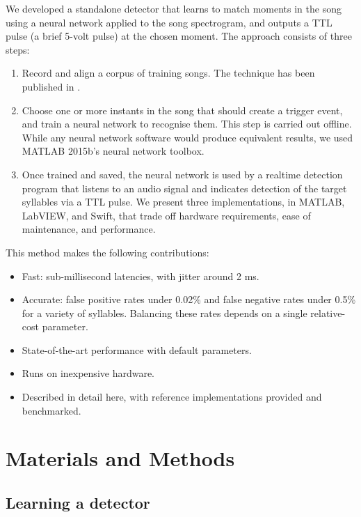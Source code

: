 \documentclass[10pt,letterpaper]{article}
\begin{document}
We developed a standalone detector that learns to match moments in the
song using a neural network applied to the song spectrogram, and
outputs a TTL pulse (a brief 5-volt pulse) at the chosen moment. The approach consists of
three steps:

\begin{enumerate}
\item Record and align a corpus of training songs.  The technique has been published in \cite{Poole2012}.
\item Choose one or more instants in the song that should create a trigger event, and train a
  neural network to recognise them. This step is carried out offline.  While any neural network software would produce equivalent results, we used MATLAB 2015b's neural network toolbox.
\item Once trained and saved, the neural network is used by a realtime
  detection program that listens to an audio signal and indicates detection of the target
  syllables via a TTL pulse.  We present three implementations, in MATLAB, LabVIEW, and Swift, that trade off hardware requirements, ease of maintenance, and performance.
\end{enumerate}
This method makes the following contributions:
\begin{itemize}
\item Fast: sub-millisecond latencies, with jitter around 2 ms.
\item Accurate: false positive rates under 0.02\% and false negative rates under 0.5\% for a variety of syllables.  Balancing these rates depends on a single relative-cost parameter.
\item State-of-the-art performance with default parameters.
\item Runs on inexpensive hardware.
\item Described in detail here, with reference implementations provided and benchmarked.
\end{itemize}



\section{Materials and Methods}
\label{sec:method}


\subsection{Learning a detector}
\end{document}
